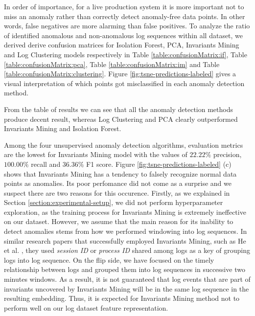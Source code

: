 In order of importance, for a live production system it is more important not to miss an anomaly rather than correctly detect anomaly-free data points. In other words, false negatives are more alarming than false positives. To analyze the ratio of identified anomalous and non-anomalous log sequences within all dataset, we derived derive confusion matrices for Isolation Forest, PCA, Invariants Mining and Log Clustering models respectively in Table \ref{table:confusionMatrix:if}, Table \ref{table:confusionMatrix:pca}, Table \ref{table:confusionMatrix:im} and Table \ref{table:confusionMatrix:clustering}. Figure \ref{fig:tsne-predictions-labeled} gives a visual interpretation of which points got misclassified in each anomaly detection method. 

From the table of results we can see that all the anomaly detection methods produce decent result, 
whereas Log Clustering and PCA clearly outperformed Invariants Mining and Isolation Forest. 

Among the four unsupervised anomaly detection algorithms, evaluation metrics are the lowest for Invariants Mining model with the values of $22.22\%$ precision, $100.00\%$ recall and $36.36\%$ F1 score. Figure \ref{fig:tsne-predictions-labeled} (c) shows that Invariants Mining has a tendency to falsely recognize normal data points as anomalies. Its poor perfomance did not come as a surprise and we suspect there are two reasons for this occurence. Firstly, as we explained in Section \ref{section:experimental-setup}, we did not perform hyperparameter exploration, as the training process for Invariants Mining is extremely ineffective on our dataset. However, we assume that the main reason for its inability to detect anomalies stems from how we performed windowing into log sequences. In similar research papers that successfully employed Invariants Mining, such as He et al. \cite{he2016}, they used \textit{session ID} or \textit{process ID} shared among logs as a key of grouping logs into log sequence. On the flip side, we have focused on the timely relationship between logs and grouped them into log sequences in successive two minutes windows. As a result, it is not guaranteed that log events that are part of invariants uncovered by Invariants Mining will be in the same log sequence in the resulting embedding. Thus, it is expected for Invariants Mining method not to perform well on our log dataset feature representation.

